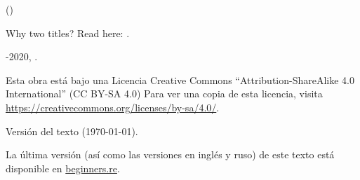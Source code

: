 ﻿\begin{titlepage}


\end{titlepage}

\newpage

\begin{center}
\vspace*{\fill}
{\LARGE \TitleMain}

\bigskip

{\large (\TitleAux)}

\bigskip
\bigskip
Why two titles? Read here: . %

\vspace*{\fill}

{\large \AUTHOR}

{\large \TT{\EMAILPRI}}
\vspace*{\fill}
\vfill

\ccbysa

-2020, \AUTHOR. 

Esta obra est\'a bajo una Licencia Creative Commons ``Attribution-ShareAlike 4.0 International'' (CC BY-SA 4.0)
Para ver una copia de esta licencia, visita \url{https://creativecommons.org/licenses/by-sa/4.0/}.

Versi\'on del texto ({\large \today}).

La \'ultima versi\'on (as\'i como las versiones en ingl\'es y ruso) de este texto est\'a disponible en
\href{http://go.yurichev.com/17009}{beginners.re}.

\end{center}
